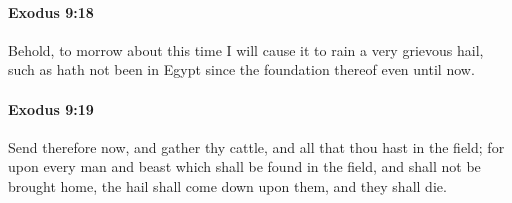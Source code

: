 		\paragraph{Exodus 9:18} %
			\label{EXODUS-9-18}

			Behold, to morrow about this time I will cause it to rain a very grievous hail, such as hath not been in Egypt since the foundation thereof even until now.


		\paragraph{Exodus 9:19} %
			\label{EXODUS-9-19}

			Send therefore now, and gather thy cattle, and all that thou hast in the field; for upon every man and beast which shall be found in the field, and shall not be brought home, the hail shall come down upon them, and they shall die.

